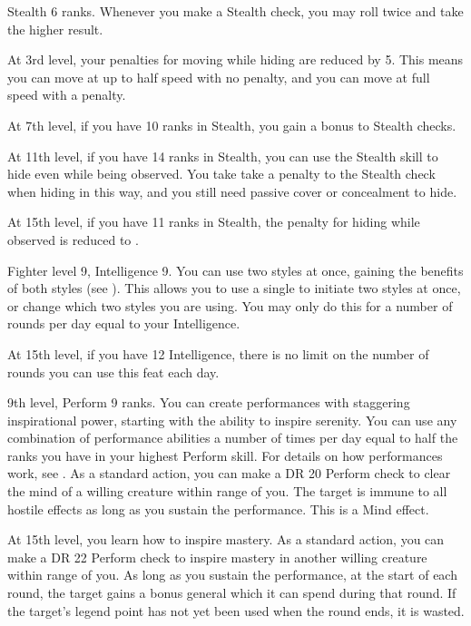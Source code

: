     \featpre Stealth 6 ranks.
    \featben Whenever you make a Stealth check, you may roll twice and take the higher result.

    At 3rd level, your penalties for moving while hiding are reduced by 5.
    This means you can move at up to half speed with no penalty, and you can move at full speed with a  penalty.

    At 7th level, if you have 10 ranks in Stealth, you gain a  bonus to Stealth checks.

    At 11th level, if you have 14 ranks in Stealth, you can use the Stealth skill to hide even while being observed.
    You take take a  penalty to the Stealth check when hiding in this way, and you still need passive cover or concealment to hide.

    At 15th level, if you have 11 ranks in Stealth, the penalty for hiding while observed is reduced to .

    \featpre Fighter level 9, Intelligence 9.
    \featben You can use two styles at once, gaining the benefits of both styles (see ).
    This allows you to use a single  to initiate two styles at once, or change which two styles you are using.
    You may only do this for a number of rounds per day equal to your Intelligence.

    At 15th level, if you have 12 Intelligence, there is no limit on the number of rounds you can use this feat each day.

    \featpres 9th level, Perform 9 ranks.
    \featben You can create performances with staggering inspirational power, starting with the ability to inspire serenity.
    You can use any combination of performance abilities a number of times per day equal to half the ranks you have in your highest Perform skill.
    For details on how performances work, see .
     As a standard action, you can make a DR 20 Perform check to clear the mind of a willing creature within \rngmed range of you.
    The target is immune to all hostile  effects as long as you sustain the performance.
    This is a Mind effect.

    At 15th level, you learn how to inspire mastery.
     As a standard action, you can make a DR 22 Perform check to inspire mastery in another willing creature within \rngmed range of you.
    As long as you sustain the performance, at the start of each round, the target gains a bonus general  which it can spend during that round.
    If the target's legend point has not yet been used when the round ends, it is wasted.

